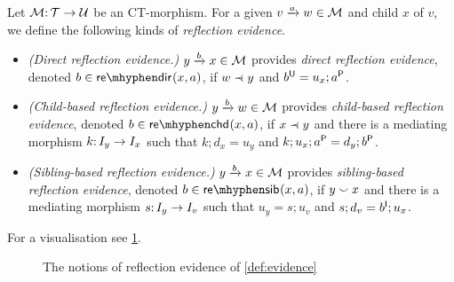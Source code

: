 \begin{definition}\label{def:evidence}
Let $\cM\of \cT\to\cU$ be an CT-morphism. For a given $\trip vaw\in\cM$ and child $x$ of $v$, we define the following kinds of \emph{reflection evidence}.
\begin{itemize}[topsep=\smallskipamount]
\item \emph{(Direct reflection evidence.)} $\trip ybx\in\cM$ provides \emph{direct reflection evidence}, denoted $\issdir b{x,a}$, if $w\parentof y$ and $b\U=u_x;a\P$.
\item \emph{(Child-based reflection evidence.)} $\trip ybw\in\cM$ provides \emph{child-based reflection evidence}, denoted $\isschd b{x,a}$, if $x\parentof y$ and there is a mediating morphism $k\of I_y\to I_x$ such that $k;d_x=u_y$ and $k;u_x;a\P=d_y;b\P$.
\item \emph{(Sibling-based reflection evidence.)} $\trip ybx\in\cM$ provides \emph{sibling-based reflection evidence}, denoted $\isssib b{x,a}$, if $y\sibling x$ and there is a mediating morphism $s\of I_y\to I_v$ such that $u_y=s;u_v$ and $s;d_v=b\I;u_x$.
\end{itemize}
\end{definition}
%
For a visualisation see \cref{fig:source-support}.
%
\begin{figure}
	
	\caption{The notions of reflection evidence of \cref{def:evidence}}
	\label{fig:source-support}
\end{figure}

